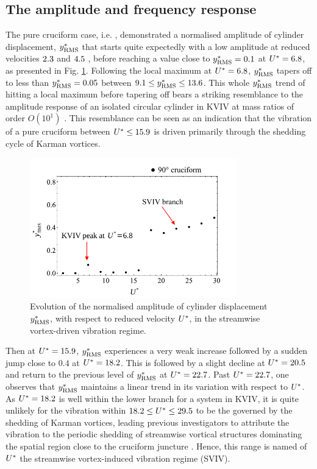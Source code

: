 \documentclass[oneside]{utmthesis}
\begin{document}
\subsection{The amplitude and frequency response}\label{ssec:svivRegimeAmpFreqResp}

The pure cruciform case, i.e. \angfi{}, demonstrated a normalised \rms{} amplitude of cylinder displacement, $y^{*}_{\text{RMS}}$ that starts quite expectedly with a low amplitude at reduced velocities $2.3$ and $4.5$ , before reaching a value close to $y^{*}_{\text{RMS}} = 0.1$ at $U^{*} = 6.8$, as presented in Fig. \ref{fig:yStrRMS1}. Following the local maximum at $U^{*} = 6.8$, $y^{*}_{\text{RMS}}$ tapers off to less than $y^{*}_{\text{RMS}} = 0.05$ between $9.1 \leq y^{*}_{\text{RMS}} \leq 13.6$. This whole $y^{*}_{\text{RMS}}$ trend of hitting a local maximum before tapering off bears a striking resemblance to the amplitude response of an isolated circular cylinder in KVIV at mass ratios of order $O(10^{1})$ \citep{Feng1963,Khalak1999}. This resemblance can be seen as an indication that the vibration of a pure cruciform between $U^{*} \leq 15.9$ is driven primarily through the shedding cycle of Karman vortices.

\begin{figure}[!h]
  \centering
  \includegraphics[width=0.8\textwidth]{figs/yStrRMS1}
  \caption{Evolution of the normalised \rms{} amplitude of cylinder displacement $y^{*}_{\text{RMS}}$, with respect to reduced velocity $U^{*}$, in the streamwise vortex-driven vibration regime.} \label{fig:yStrRMS1}
\end{figure}

Then at $U^{*} = 15.9$, $y^{*}_{\text{RMS}}$ experiences a very weak increase followed by a sudden jump close to $0.4$ at $U^{*} = 18.2$. This is followed by a slight decline at $U^{*} = 20.5$ and return to the previous level of $y^{*}_{\text{RMS}}$ at $U^{*} = 22.7$. Past $U^{*} = 22.7$, one observes that $y^{*}_{\text{RMS}}$ maintains a linear trend in its variation with respect to $U^{*}$. As $U^{*} = 18.2$ is well within the lower branch for a system in KVIV, it is quite unlikely for the vibration within $18.2 \leq U^{*} \leq 29.5$ to be the governed by the shedding of Karman vortices, leading previous investigators to attribute the vibration to the periodic shedding of streamwise vortical structures dominating the spatial region close to the cruciform juncture \citep{Shirakashi1989,Hemsuwan2018b,Hemsuwan2018d}. Hence, this range is named of $U^{*}$ the streamwise vortex-induced vibration regime (SVIV).
\end{document}
